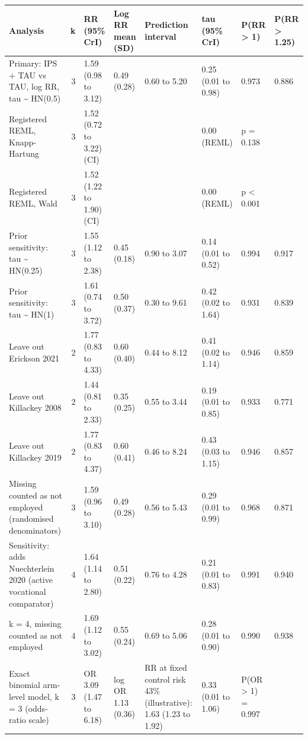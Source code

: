 
\begin{tabular}{lrllllll}
\toprule
Analysis & k & RR (95\% CrI) & Log RR mean (SD) & Prediction interval & tau (95\% CrI) & P(RR > 1) & P(RR > 1.25)\\
\midrule
Primary: IPS + TAU vs TAU, log RR, tau \textasciitilde{} HN(0.5) & 3 & 1.59 (0.98 to 3.12) & 0.49 (0.28) & 0.60 to 5.20 & 0.25 (0.01 to 0.98) & 0.973 & 0.886\\
Registered REML, Knapp-Hartung & 3 & 1.52 (0.72 to 3.22) (CI) &  &  & 0.00 (REML) & p = 0.138 & \\
Registered REML, Wald & 3 & 1.52 (1.22 to 1.90) (CI) &  &  & 0.00 (REML) & p < 0.001 & \\
Prior sensitivity: tau \textasciitilde{} HN(0.25) & 3 & 1.55 (1.12 to 2.38) & 0.45 (0.18) & 0.90 to 3.07 & 0.14 (0.01 to 0.52) & 0.994 & 0.917\\
Prior sensitivity: tau \textasciitilde{} HN(1) & 3 & 1.61 (0.74 to 3.72) & 0.50 (0.37) & 0.30 to 9.61 & 0.42 (0.02 to 1.64) & 0.931 & 0.839\\
Leave out Erickson 2021 & 2 & 1.77 (0.83 to 4.33) & 0.60 (0.40) & 0.44 to 8.12 & 0.41 (0.02 to 1.14) & 0.946 & 0.859\\
Leave out Killackey 2008 & 2 & 1.44 (0.81 to 2.33) & 0.35 (0.25) & 0.55 to 3.44 & 0.19 (0.01 to 0.85) & 0.933 & 0.771\\
Leave out Killackey 2019 & 2 & 1.77 (0.83 to 4.37) & 0.60 (0.41) & 0.46 to 8.24 & 0.43 (0.03 to 1.15) & 0.946 & 0.857\\
Missing counted as not employed (randomised denominators) & 3 & 1.59 (0.96 to 3.10) & 0.49 (0.28) & 0.56 to 5.43 & 0.29 (0.01 to 0.99) & 0.968 & 0.871\\
Sensitivity: adds Nuechterlein 2020 (active vocational comparator) & 4 & 1.64 (1.14 to 2.80) & 0.51 (0.22) & 0.76 to 4.28 & 0.21 (0.01 to 0.83) & 0.991 & 0.940\\
k = 4, missing counted as not employed & 4 & 1.69 (1.12 to 3.02) & 0.55 (0.24) & 0.69 to 5.06 & 0.28 (0.01 to 0.90) & 0.990 & 0.938\\
Exact binomial arm-level model, k = 3 (odds-ratio scale) & 3 & OR 3.09 (1.47 to 6.18) & log OR 1.13 (0.36) & RR at fixed control risk 43\% (illustrative): 1.63 (1.23 to 1.92) & 0.33 (0.01 to 1.06) & P(OR > 1) = 0.997 & \\
\bottomrule
\end{tabular}
